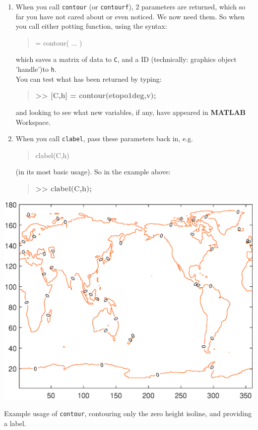 \documentclass{tufte-book} %
\newenvironment{docspec}{\begin{quotation}\ttfamily\parskip0pt\parindent0pt\ignorespaces}{\end{quotation}}
\newenvironment{docspecbold}{\begin{quotation}\ttfamily\bfseries\parskip0pt\parindent0pt\ignorespaces}{\end{quotation}}
\begin{document}
\begin{enumerate}[noitemsep]
\setlength{\itemindent}{.2in}
\item When you call \texttt{contour} (or \texttt{contourf}), 2 parameters are returned, which so far you have not cared about or even noticed. We now need them. So when you call either potting function, using the syntax:
\begin{docspec}
[C,h] = contour( ... )
\end{docspec}
which saves a matrix of data to \texttt{C}, and a ID (technically: graphics object 'handle')to \texttt{h}.
\\You can test what has been returned by typing:
\begin{docspecbold}
>> [C,h] = contour(etopo1deg,v);
\end{docspecbold}
and looking to see what new variables, if any, have appeared in \textbf{MATLAB} \textsf{Workspace}.
\item When you call \texttt{clabel}, pass these parameters back in, e.g.
\begin{docspec}
clabel(C,h)
\end{docspec}
(in its most basic usage). So in the example above:
\begin{docspecbold}
>> clabel(C,h);
\end{docspecbold}
\end{enumerate}

\begin{marginfigure}[0.0in]
\includegraphics[width=\linewidth]{ch5-contour4.eps}
\caption{Example usage of \texttt{contour}, contouring only the zero height isoline, and providing a label.}
\label{fig:ch5-contour4}
\end{marginfigure}
\end{document}
